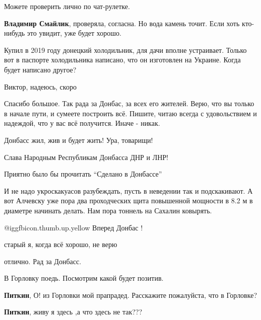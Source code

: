 \begin{itemize}
Можете проверить лично по чат-рулетке.

\begin{itemize} %
\textbf{Владимир Смайлик}, проверяла, согласна. Но вода камень точит. Если хоть кто-нибудь это увидит, уже будет хорошо.
\end{itemize} %


Купил в 2019 году донецкий холодильник, для дачи вполне устраивает. Только вот
в паспорте холодильника написано, что он изготовлен на Украине. Когда будет
написано другое?

\begin{itemize} %
Виктор, надеюсь, скоро
\end{itemize} %


Спасибо большое. Так рада за Донбас, за всех его жителей. Верю, что вы только в
начале пути, и сумеете построить всё. Пишите, читаю всегда с удовольствием и
надеждой, что у вас всё получится. Иначе - никак.


Донбасс жил, жив и будет жить! Ура, товарищи!

Слава Народным Республикам Донбасса ДНР и ЛНР!


Приятно было бы прочитать \enquote{Сделано в Донбассе}

И не надо укроскакуасов разубеждать, пусть в неведении так и подскакивают. А
вот Алчевску уже пора два проходческих щита повышенной мощности в 8.2 м в
диаметре начинать делать. Нам пора тоннель на Сахалин ковырять.


 @igg{fbicon.thumb.up.yellow}  Вперед Донбас !


старый я, когда всё хорошо, не верю

отлично. Рад за Донбасс.


В Горловку поедь. Посмотрим какой будет позитив.

\begin{itemize} %
\textbf{Питкин}, О! из Горловки мой прапрадед. Расскажите пожалуйста, что в Горловке?

\textbf{Питкин}, живу я здесь ,а что здесь не так???


\end{itemize}
\end{itemize}
